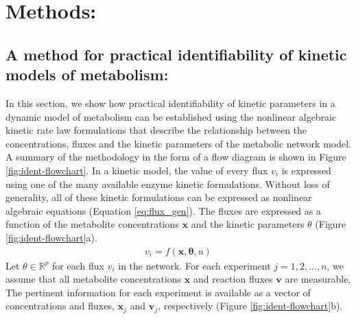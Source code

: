 \documentclass[10pt]{article}
\begin{document}
\section{Methods:}	
\subsection{A method for practical identifiability of kinetic models of metabolism:}\label{sec:ident}
In this section, we show how practical identifiability of kinetic parameters in a dynamic model of metabolism can be established using the nonlinear algebraic kinetic rate law formulations that describe the relationship between the concentrations, fluxes and the kinetic parameters of the metabolic network model. A summary of the methodology in the form of a flow diagram is shown in Figure \ref{fig:ident-flowchart}.
In a kinetic model, the value of every flux $v_i$ is expressed using one of the many available enzyme kinetic formulations. Without loss of generality, all of these kinetic formulations can be expressed as nonlinear algebraic equations (Equation \ref{eq:flux_gen}). The fluxes are expressed as a function of the metabolite concentrations $\mathbf{x}$ and the kinetic parameters $\theta$ (Figure \ref{fig:ident-flowchart}a). 
\begin{align}\label{eq:flux_gen}
v_i = f(\mathbf{x},\mathbf{\theta}, u)
\end{align}
Let $\theta \in \mathbb{R}^p$ for each flux $v_i$ in the network. For each experiment $j = {1, 2, ..., n}$, we assume that all metabolite concentrations $\mathbf{x}$ and reaction fluxes $\mathbf{v}$ are measurable. The pertinent information for each experiment is available as a vector of concentrations and fluxes, $\mathbf{x}_j$ and $\mathbf{v}_j$, respectively (Figure \ref{fig:ident-flowchart}b). 
\end{document}
